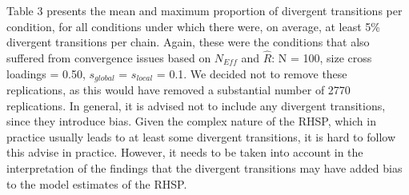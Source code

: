 \documentclass[
  man, donotrepeattitle,floatsintext]{apa6}
\begin{document}
Table 3 presents the mean and maximum proportion of divergent
transitions per condition, for all conditions under which there were, on
average, at least 5\% divergent transitions per chain. Again, these were
the conditions that also suffered from convergence issues based on
\(N_{Eff}\) and \(\hat{R}\): N = 100, size cross loadings = 0.50,
\(s_{global}\) = \(s_{local}\) = 0.1. We decided not to remove these
replications, as this would have removed a substantial number of 2770
replications. In general, it is advised not to include any divergent
transitions, since they introduce bias. Given the complex nature of the
RHSP, which in practice usually leads to at least some divergent
transitions, it is hard to follow this advise in practice. However, it
needs to be taken into account in the interpretation of the findings
that the divergent transitions may have added bias to the model
estimates of the RHSP.
\end{document}
